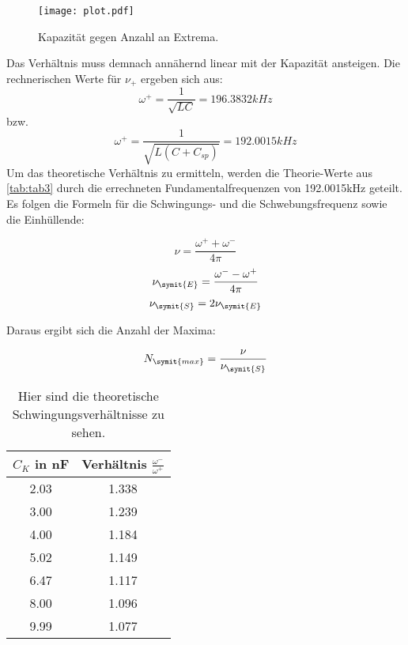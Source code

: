 \begin{figure}
  \centering
  \texttt{[image: plot.pdf]}
  \caption{Kapazität gegen Anzahl an Extrema.}
  \label{fig:plot}
\end{figure}
\newpage
Das Verhältnis muss demnach annähernd linear mit der Kapazität ansteigen.
Die rechnerischen Werte für \(\nu_+\) ergeben sich aus:
\begin{equation}
  \omega^+ = \frac{1}{\sqrt{LC}} = 196.3832kHz
\end{equation}
bzw.
\begin{equation}
  \omega^+ = \frac{1}{\sqrt{L(C+C_{sp})}} = 192.0015kHz
\end{equation}
Um das theoretische Verhältnis zu ermitteln, werden die Theorie-Werte aus \autoref{tab:tab3} durch die errechneten Fundamentalfrequenzen von 192.0015kHz geteilt.
Es folgen die Formeln für die Schwingungs- und die Schwebungsfrequenz sowie die Einhüllende:

\begin{equation}
 \nu =\frac{\omega^+ + \omega^-}{4\pi}
\end{equation}
\begin{equation} 
 \nu_{\symit{E}} = \frac{\omega^- - \omega^+}{4\pi}
\end{equation}
\begin{equation}
 \nu_{\symit{S}} = 2\nu_{\symit{E}}
\end{equation}

Daraus ergibt sich die Anzahl der Maxima:

\begin{equation}
 N_{\symit{max}} = \frac{\nu}{\nu_{\symit{S}}}
\end{equation}

\begin{table}
  \centering
  \caption{Hier sind die theoretische Schwingungsverhältnisse zu sehen.}
  \label{tab:tab6}
  \begin{tabular}{c c}
    \toprule
    \(C_K\) in nF & Verhältnis \(\frac{\omega^-}{\omega^+}\)\\
    \midrule
    2.03 & 1.338 \\
    3.00 & 1.239 \\
    4.00 & 1.184 \\
    5.02 & 1.149 \\
    6.47 & 1.117 \\
    8.00 & 1.096 \\
    9.99 & 1.077 \\
    \bottomrule
  \end{tabular}
\end{table}


